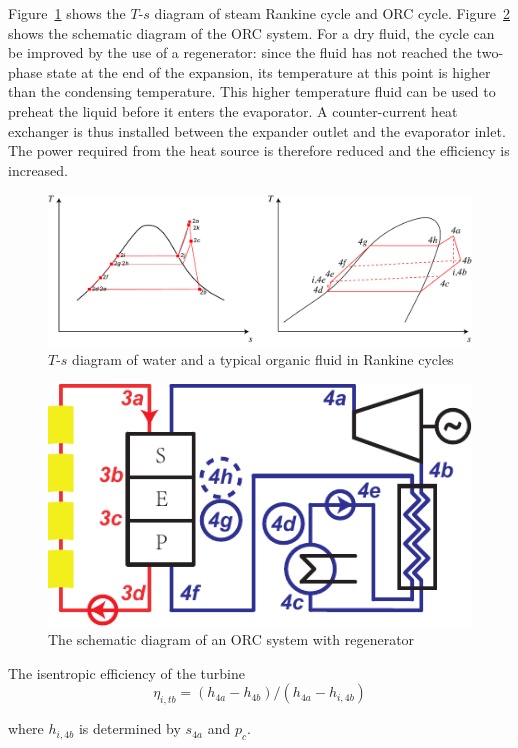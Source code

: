 Figure~\ref{fig:$T$-$s$_2systems} shows the $T$-$s$ diagram of steam Rankine cycle and ORC cycle. Figure~\ref{fig:ORCsystem2} shows the schematic diagram of the ORC system. For a dry fluid, the cycle can be improved by the use of a regenerator: since the fluid has not reached the two-phase state at the end of the expansion, its temperature at this point is higher than the condensing temperature. This higher temperature fluid can be used to preheat the liquid before it enters the evaporator.
A counter-current heat exchanger is thus installed between the expander outlet and the evaporator inlet. The power required from the heat source is therefore reduced and the efficiency is increased.

\noindent \begin{figure}[htbp]
\begin{center}
	\includegraphics[width = 0.8\columnwidth]{fig/Ts.pdf}
	\caption{$T$-$s$ diagram of water and a typical organic fluid in Rankine cycles}
	\label{fig:$T$-$s$_2systems}
\end{center}
\end{figure}

\noindent \begin{figure}[htbp]
\begin{center}
	\includegraphics[width = 0.4\columnwidth]{fig/ORCsystem2.pdf}
	\caption{The schematic diagram of an ORC system with regenerator}
	\label{fig:ORCsystem2}
\end{center}
\end{figure}

The isentropic efficiency of the turbine
\begin{equation}
  \eta_{i,tb} = (h_{4a}-h_{4b})/(h_{4a}-h_{i,4b})
\end{equation}

where $h_{i,4b}$ is determined by $s_{4a}$ and $p_c$.


